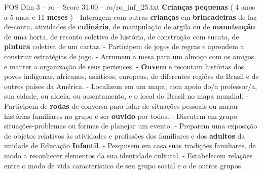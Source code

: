 \begin{textsample}{POS Dim 3 – ro – Score 31.00 – ro/ro\_inf\_25.txt}  \label{ex:f3_pos_133}
\textbf{Crianças} \textbf{pequenas} ( 4 anos a 5 anos e 11 \textbf{meses} ) - Interagem com outras \textbf{crianças} em \textbf{brincadeiras} de faz-de-conta, atividades de \textbf{culinária}, de manipulação de argila ou de \textbf{manutenção} de uma horta, de reconto coletivo de história, de construção com sucata, de \textbf{pintura} coletiva de um cartaz. - Participem de jogos de regras e aprendem a construir estratégias de jogo. - Arrumem a mesa para um almoço com os amigos, e manter a organização de seus pertences. - \textbf{Ouvem} e recontam histórias dos povos indígenas, africanos, asiáticos, europeus, de diferentes regiões do Brasil e de outros países da América. - Localizem em um mapa, com apoio do/a professor/a, sua cidade, ou aldeia, ou assentamento, e o local do Brasil no mapa mundial. - Participem de \textbf{rodas} de conversa para falar de situações pessoais ou narrar histórias familiares no grupo e ser \textbf{ouvido} por todos. - Discutem em grupo situações-problemas ou formas de planejar um evento. - Preparem uma exposição de objetos relativos às atividades e profissões dos familiares e dos \textbf{adultos} da unidade de Educação \textbf{Infantil}. - Pesquisem em casa suas tradições familiares, de modo a reconhecer elementos da sua identidade cultural. - Estabelecem relações entre o modo de vida característico de seu grupo social e o de outros grupos.

\end{textsample}
